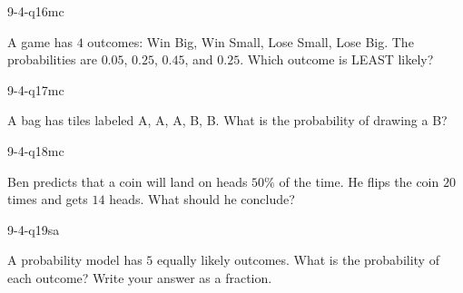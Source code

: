 \begin{practiceQuestion}{9-4-q16}{mc}
\begin{questionText}
A game has $4$ outcomes: Win Big, Win Small, Lose Small, Lose Big. The probabilities are $0.05$, $0.25$, $0.45$, and $0.25$. Which outcome is LEAST likely?
\end{questionText}
\end{practiceQuestion}

\begin{practiceQuestion}{9-4-q17}{mc}
\begin{questionText}
A bag has tiles labeled A, A, A, B, B. What is the probability of drawing a B?
\end{questionText}
\end{practiceQuestion}

\begin{practiceQuestion}{9-4-q18}{mc}
\begin{questionText}
Ben predicts that a coin will land on heads $50\%$ of the time. He flips the coin $20$ times and gets $14$ heads. What should he conclude?
\end{questionText}
\end{practiceQuestion}


\begin{practiceQuestion}{9-4-q19}{sa}
\begin{questionText}
A probability model has $5$ equally likely outcomes. What is the probability of each outcome? Write your answer as a fraction.
\end{questionText}
\end{practiceQuestion}

